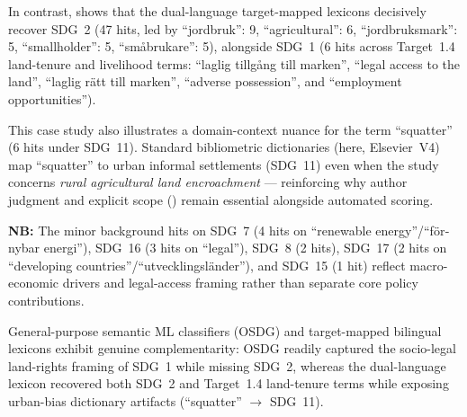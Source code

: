 \begin{casestudySection}
In contrast,  shows that the dual-language target-mapped lexicons decisively recover \gls{SDG}~2 (\num{47} hits, led by \enquote{\foreignlanguage{swedish}{jordbruk}}: 9, \enquote{agricultural}: 6, \enquote{\foreignlanguage{swedish}{jordbruksmark}}: 5, \enquote{smallholder}: 5, \enquote{\foreignlanguage{swedish}{småbrukare}}: 5), alongside \gls{SDG}~1 (\num{6} hits across Target~1.4 land-tenure and livelihood terms: \enquote{\foreignlanguage{swedish}{laglig tillgång till marken}}, \enquote{legal access to the land}, \enquote{\foreignlanguage{swedish}{laglig rätt till marken}}, \enquote{adverse possession}, and \enquote{employment opportunities}).

This case study also illustrates a domain-context nuance for the term \enquote{squatter} (\num{6} hits under \gls{SDG}~11). Standard bibliometric dictionaries (here, Elsevier~V4) map \enquote{squatter} to urban informal settlements (\gls{SDG}~11) even when the study concerns \textit{rural agricultural land encroachment} --- reinforcing why author judgment and explicit scope () remain essential alongside automated scoring.

\textbf{NB:} The minor background hits on \gls{SDG}~7 (\num{4} hits on \enquote{renewable energy}/\enquote{\foreignlanguage{swedish}{förnybar energi}}), \gls{SDG}~16 (\num{3} hits on \enquote{legal}), \gls{SDG}~8 (\num{2} hits), \gls{SDG}~17 (\num{2} hits on \enquote{developing countries}/\enquote{\foreignlanguage{swedish}{utvecklingsländer}}), and \gls{SDG}~15 (\num{1} hit) reflect macro-economic drivers and legal-access framing rather than separate core policy contributions.
\end{casestudySection}

\begin{takeaway}
General-purpose semantic \gls{ML} classifiers (\eg OSDG) and target-mapped bilingual lexicons exhibit genuine complementarity: OSDG readily captured the socio-legal land-rights framing of \gls{SDG}~1 while missing \gls{SDG}~2, whereas the dual-language lexicon recovered both \gls{SDG}~2 and Target~1.4 land-tenure terms while exposing urban-bias dictionary artifacts (\enquote{squatter} $\rightarrow$ \gls{SDG}~11).
\end{takeaway}

